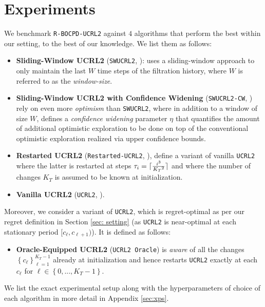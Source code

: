 \documentclass{article} %
\DeclarePairedDelimiter\ceil{\lceil}{\rceil}
\begin{document}
\section{Experiments} \label{xps:main}
\vspace{-1em}
We benchmark \texttt{R-BOCPD-UCRL2} against $4$ algorithms that perform the best within our setting, to the best of our knowledge. We list them as follows:
\begin{itemize}
    \item \textbf{Sliding-Window UCRL2} (\texttt{SWUCRL2},  \cite{SWUCRL}): uses a sliding-window approach to only maintain the last $W$ time steps of the filtration history, where $W$ is referred to as the \textit{window-size}. 
    \item \textbf{Sliding-Window UCRL2 with Confidence Widening} (\texttt{SWUCRL2-CW}, \cite{SWUCRL2CW}) rely on even more \textit{optimism} than \texttt{SWUCRL2}, where in addition to a window of size $W$, defines a \textit{confidence widening} parameter $\eta$ that quantifies the amount of additional optimistic exploration to be done on top of the conventional optimistic exploration realized via upper confidence bounds. 
    \item \textbf{Restarted UCRL2} (\texttt{Restarted-UCRL2}, \cite{UCRL2}), define a variant of vanilla \texttt{UCRL2} where  the latter is restarted at steps $\tau_i = \ceil{\frac{i^3}{{K_T}^2}}$ and where the number of changes $K_T$ is assumed to be known at initialization. 
    \item \textbf{Vanilla UCRL2} (\texttt{UCRL2}, \cite{UCRL2}).
\end{itemize}
 
 Moreover, we consider a variant of \texttt{UCRL2}, which is regret-optimal as per our regret definition in Section \ref{sec: setting} (as \texttt{UCRL2} is near-optimal at each stationary period $[c_\ell, c_{\ell+1})$). It is defined as follows:
 \begin{itemize}
     \item \textbf{Oracle-Equipped UCRL2} (\texttt{UCRL2 Oracle}) is \textit{aware} of all the changes $\left\{c_\ell\right\}_{\ell=1}^{K_T-1}$ already at initialization and hence restarts \texttt{UCRL2} exactly at each $c_\ell$ for $\ell \in \left\lbrace 0,..., K_T-1 \right\rbrace$. 
 \end{itemize}
 
 We list the exact experimental setup along with the hyperparameters of choice of each algorithm in more detail in Appendix \ref{sec:xps}.  
\end{document}
